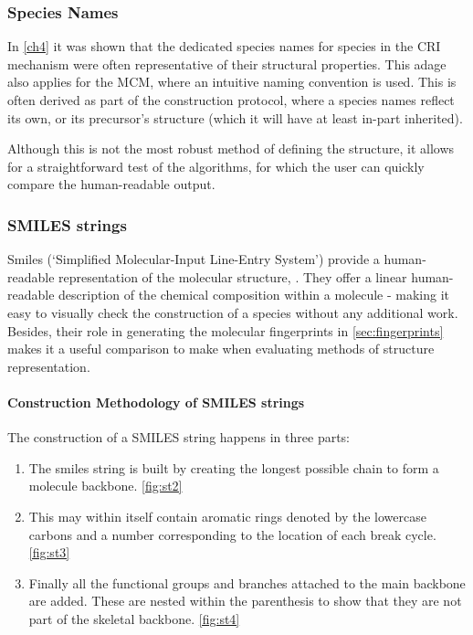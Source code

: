 \subsubsection{Species Names}
In \autoref{ch4} it was shown that the dedicated species names for species in the CRI mechanism were often representative of their structural properties. This adage also applies for the MCM, where an intuitive naming convention is used. This is often derived as part of the construction protocol, where a species names reflect its own, or its precursor's structure (which it will have at least in-part inherited).

Although this is not the most robust method of defining the structure, it allows for a straightforward test of the algorithms, for which the user can quickly compare the human-readable output. 


\subsubsection{SMILES strings}\label{sec:smiles}


 Smiles (`Simplified Molecular-Input Line-Entry System') provide a human-readable representation of the molecular structure,
 \citep{smiles}. They offer a linear human-readable description of the chemical composition within a molecule - making it easy to visually check the construction of a species without any additional work. Besides, their role in generating the molecular fingerprints in \autoref{sec:fingerprints} makes it a useful comparison to make when evaluating methods of structure representation. 

\paragraph*{Construction Methodology of SMILES strings}
The construction of a SMILES string happens in three parts:

\begin{enumerate}
    \item The smiles string is built by creating the longest possible chain to form a molecule backbone.
    \autoref{fig:st2}

    \item This may within itself contain aromatic rings denoted by the lowercase carbons and a number corresponding to the location of each break cycle. \autoref{fig:st3}

    \item Finally all the functional groups and branches attached to the main backbone are added. These are nested within the parenthesis to show that they are not part of the skeletal backbone. \autoref{fig:st4}
\end{enumerate}



